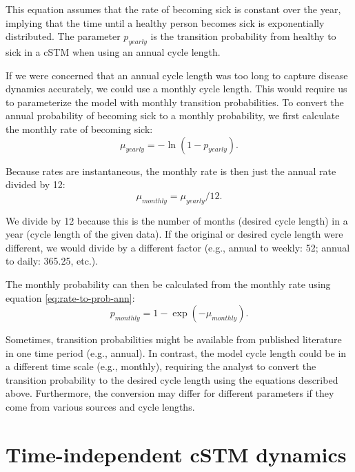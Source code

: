 \documentclass[
]{article}
\begin{document}
This equation assumes that the rate of becoming sick is constant over the year, implying that the time until a healthy person becomes sick is exponentially distributed. The parameter \(p_{yearly}\) is the transition probability from healthy to sick in a cSTM when using an annual cycle length.

If we were concerned that an annual cycle length was too long to capture disease dynamics accurately, we could use a monthly cycle length. This would require us to parameterize the model with monthly transition probabilities. To convert the annual probability of becoming sick to a monthly probability, we first calculate the monthly rate of becoming sick:
\begin{equation}
    \mu_{yearly} = -\ln{\left(1-p_{yearly}\right)}.
    \label{eq:prob-to-rate-ann}
\end{equation}

Because rates are instantaneous, the monthly rate is then just the annual rate divided by 12:
\begin{equation}
    \mu_{monthly} = \mu_{yearly} / 12.
    \label{eq:rate-ann-to-month}
\end{equation}

We divide by 12 because this is the number of months (desired cycle length) in a year (cycle length of the given data). If the original or desired cycle length were different, we would divide by a different factor (e.g., annual to weekly: 52; annual to daily: 365.25, etc.).

The monthly probability can then be calculated from the monthly rate using equation \eqref{eq:rate-to-prob-ann}:
\begin{equation}
    p_{monthly} = 1-\exp{\left(-\mu_{monthly}\right)}.
    \label{eq:rate-to-prob-month}
\end{equation}

Sometimes, transition probabilities might be available from published literature in one time period (e.g., annual). In contrast, the model cycle length could be in a different time scale (e.g., monthly), requiring the analyst to convert the transition probability to the desired cycle length using the equations described above. Furthermore, the conversion may differ for different parameters if they come from various sources and cycle lengths.

\hypertarget{time-independent-cstm-dynamics}{%
\section{Time-independent cSTM dynamics}\label{time-independent-cstm-dynamics}}
\end{document}
